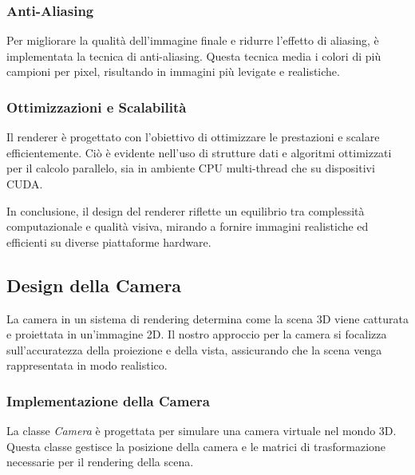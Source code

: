 \documentclass[12pt]{article}
\begin{document}
\subsubsection{Anti-Aliasing}
Per migliorare la qualità dell'immagine finale e ridurre l'effetto di aliasing, è implementata la tecnica di anti-aliasing. Questa tecnica media i colori di più campioni per pixel, risultando in immagini più levigate e realistiche.

\subsubsection{Ottimizzazioni e Scalabilità}
Il renderer è progettato con l'obiettivo di ottimizzare le prestazioni e scalare efficientemente. Ciò è evidente nell'uso di strutture dati e algoritmi ottimizzati per il calcolo parallelo, sia in ambiente CPU multi-thread che su dispositivi CUDA.

In conclusione, il design del renderer riflette un equilibrio tra complessità computazionale e qualità visiva, mirando a fornire immagini realistiche ed efficienti su diverse piattaforme hardware.


\subsection{Design della Camera}
La camera in un sistema di rendering determina come la scena 3D viene catturata e proiettata in un'immagine 2D. Il nostro approccio per la camera si focalizza sull'accuratezza della proiezione e della vista, assicurando che la scena venga rappresentata in modo realistico.

\subsubsection{Implementazione della Camera}
La classe \textit{Camera} è progettata per simulare una camera virtuale nel mondo 3D. Questa classe gestisce la posizione della camera e le matrici di trasformazione necessarie per il rendering della scena.
\end{document}
